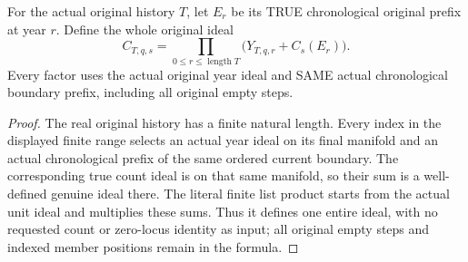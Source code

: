 \begin{definition}
\label{hir:original-chronological-companion-count-ideal-definition}
\leanok
{}
For the actual original history $T$, let $E_r$ be its TRUE chronological
original prefix at year $r$. Define the whole original ideal
\[
 C_{T,q,s}=\prod_{0\leq r\leq\operatorname{length}T}
        \bigl(Y_{T,q,r}+C_s(E_r)\bigr).
\]
Every factor uses the actual original year ideal and SAME actual chronological
boundary prefix, including all original empty steps.
\end{definition}
\begin{proof}
The real original history has a finite natural length. Every index in the
displayed finite range selects an actual year ideal on its final manifold
and an actual chronological prefix of the same ordered current boundary.
The corresponding true count ideal is on that same manifold, so their sum
is a well-defined genuine ideal there. The literal finite list product
starts from the actual unit ideal and multiplies these sums. Thus it defines
one entire ideal, with no requested count or zero-locus identity as input;
all original empty steps and indexed member positions remain in the formula.
\end{proof}

